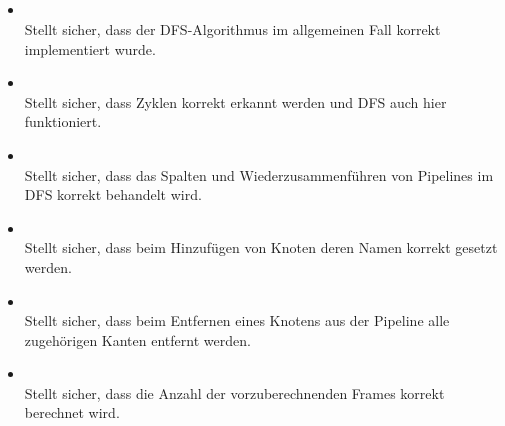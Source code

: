 \subsection{}

\paragraph{}
\begin{itemize}
	\item {} \\
	Stellt sicher, dass der DFS-Algorithmus im allgemeinen Fall korrekt implementiert wurde.

	\item {} \\
	Stellt sicher, dass Zyklen korrekt erkannt werden und DFS auch hier funktioniert.

	\item {} \\
	Stellt sicher, dass das Spalten und Wiederzusammenführen von Pipelines im DFS korrekt behandelt wird.

	\item {} \\
	Stellt sicher, dass beim Hinzufügen von Knoten deren Namen korrekt gesetzt werden.

	\item {} \\
	Stellt sicher, dass beim Entfernen eines Knotens aus der Pipeline alle zugehörigen Kanten entfernt werden.

	\item {} \\
	Stellt sicher, dass die Anzahl der vorzuberechnenden Frames korrekt berechnet wird.
\end{itemize}

